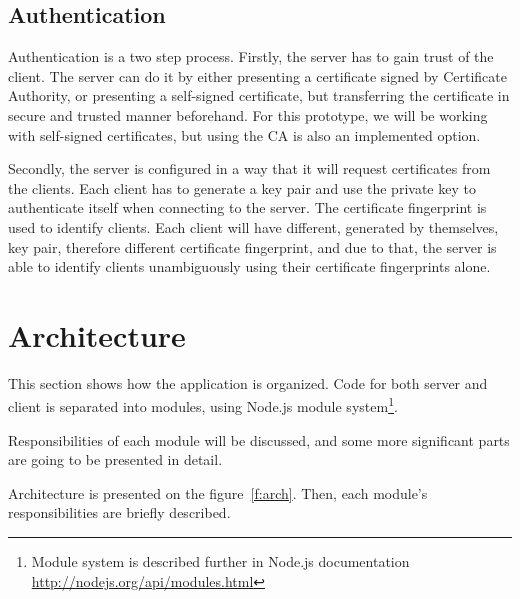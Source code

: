 \subsection{Authentication}
\label{s:authentication}

Authentication is a two step process. Firstly, the server has to gain trust of the client. The server can do it by either presenting a certificate signed by Certificate Authority, or presenting a self-signed certificate, but transferring the certificate in secure and trusted manner beforehand. For this prototype, we will be working with self-signed certificates, but using the CA is also an implemented option.

Secondly, the server is configured in a way that it will request certificates from the clients. Each client has to generate a key pair and use the private key to authenticate itself when connecting to the server. The certificate fingerprint is used to identify clients. Each client will have different, generated by themselves, key pair, therefore different certificate fingerprint, and due to that, the server is able to identify clients unambiguously using their certificate fingerprints alone.

\section{Architecture}

This section shows how the application is organized. Code for both server and client is separated into modules, using Node.js module system\footnote{Module system is described further in Node.js documentation \url{http://nodejs.org/api/modules.html}}.

Responsibilities of each module will be discussed, and some more significant parts are going to be presented in detail.

Architecture is presented on the figure~\ref{f:arch}. Then, each module's responsibilities are briefly described.

